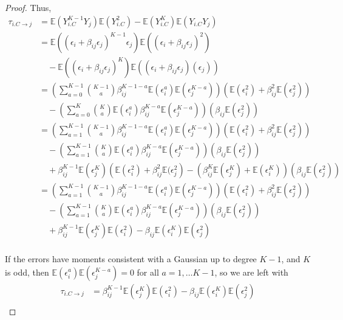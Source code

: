 \documentclass[]{article}
\newcommand{\E}{\mathbb{E}}
\begin{document}
\begin{proof}
Thus,
\begin{equation}
\begin{aligned}
\tau_{i.C\rightarrow j} & = \E (Y_{i.C}^{K-1} Y_j) \E (Y_{i.C}^2) - \E (Y_{i.C}^K) \E (Y_{i.C} Y_j)\\
& = \E\left((\epsilon_i + \beta_{ij}\epsilon_j)^{K-1} \epsilon_j \right)
\E\left((\epsilon_i + \beta_{ij}\epsilon_j)^2\right)\\
&\quad - \E\left((\epsilon_i + \beta_{ij}\epsilon_j)^K\right) \E\left((\epsilon_i + \beta_{ij}\epsilon_j) (\epsilon_j)\right)\\
& =
\left(\sum_{a = 0}^{K-1}{K-1 \choose a} \beta_{ij}^{K-1 - a}\E\left(\epsilon_i^a\right) \E\left(\epsilon_j^{K-a}\right)\right) \left(\E(\epsilon_i^2)  + \beta_{ij}^2\E(\epsilon_j^2) \right)
\\
&\quad - \left(\sum_{a = 0}^K {K \choose a} \E\left(\epsilon_i^a \right) \beta_{ij}^{K - a}\E\left(\epsilon_j^{K - a}\right)\right)
\left(\beta_{ij}\E\left(\epsilon_j^2\right) \right)\\
&=\left(\sum_{a = 1}^{K-1}{K-1 \choose a} \beta_{ij}^{K-1 - a}\E\left(\epsilon_i^a\right) \E\left(\epsilon_j^{K-a}\right)\right) \left(\E(\epsilon_i^2)  + \beta_{ij}^2\E(\epsilon_j^2) \right)
\\
&\quad - \left(\sum_{a = 1}^{K-1} {K \choose a} \E\left(\epsilon_i^a \right) \beta_{ij}^{K - a}\E\left(\epsilon_j^{K - a}\right)\right)
\left(\beta_{ij}\E\left(\epsilon_j^2\right) \right)
\\
&\quad + \beta_{ij}^{K-1}\E(\epsilon_j^K)\left(\E(\epsilon_i^2) + \beta_{ij}^2\E(\epsilon_j^2\right) - \left(\beta_{ij}^K\E(\epsilon_j^K) + \E(\epsilon_i^K) \right)\left(\beta_{ij}\E(\epsilon_j^2)\right)\\
& = \left(\sum_{a = 1}^{K-1}{K-1 \choose a} \beta_{ij}^{K-1 - a}\E\left(\epsilon_i^a\right) \E\left(\epsilon_j^{K-a}\right)\right) \left(\E(\epsilon_i^2)  + \beta_{ij}^2\E(\epsilon_j^2) \right)
\\
&\quad - \left(\sum_{a = 1}^{K-1} {K \choose a} \E\left(\epsilon_i^a \right) \beta_{ij}^{K - a}\E\left(\epsilon_j^{K - a}\right)\right)
\left(\beta_{ij}\E\left(\epsilon_j^2\right) \right)\\
& \quad + \beta_{ij}^{K-1}\E(\epsilon_j^K)\E(\epsilon_i^2) - \beta_{ij}\E(\epsilon_i^K)\E(\epsilon_j^2)\\
\end{aligned}
\end{equation}

If the errors have moments consistent with a Gaussian up to degree $K-1$, and $K$ is odd, then $\E(\epsilon_i^a)\E(\epsilon_j^{K-a}) = 0$ for all $a = 1, \ldots K-1$, so we are left with
\begin{equation}
\begin{aligned}
\tau_{i.C\rightarrow j} &= \beta_{ij}^{K-1}\E(\epsilon_j^K)\E(\epsilon_i^2) - \beta_{ij}\E(\epsilon_i^K)\E(\epsilon_j^2)\\
\end{aligned}
\end{equation}


\end{proof}
\end{document}
